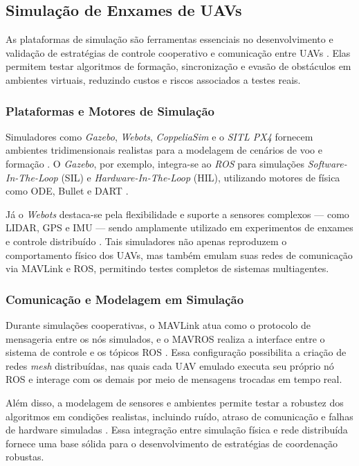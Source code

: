 \documentclass[portuguese]{sbcreviews-2025}%
\begin{document}
\subsection{Simulação de Enxames de UAVs}

As plataformas de simulação são ferramentas essenciais no desenvolvimento e validação de estratégias de controle cooperativo e comunicação entre UAVs \cite{khaliq2021, ziming2023}. Elas permitem testar algoritmos de formação, sincronização e evasão de obstáculos em ambientes virtuais, reduzindo custos e riscos associados a testes reais.

\subsubsection{Plataformas e Motores de Simulação}

Simuladores como \textit{Gazebo}, \textit{Webots}, \textit{CoppeliaSim} e o \textit{SITL PX4} fornecem ambientes tridimensionais realistas para a modelagem de cenários de voo e formação \cite{ziming2023}. O \textit{Gazebo}, por exemplo, integra-se ao \textit{ROS} para simulações \textit{Software-In-The-Loop} (SIL) e \textit{Hardware-In-The-Loop} (HIL), utilizando motores de física como ODE, Bullet e DART \cite{khaliq2021}.

Já o \textit{Webots} destaca-se pela flexibilidade e suporte a sensores complexos — como LIDAR, GPS e IMU — sendo amplamente utilizado em experimentos de enxames e controle distribuído \cite{ziming2023}. Tais simuladores não apenas reproduzem o comportamento físico dos UAVs, mas também emulam suas redes de comunicação via MAVLink e ROS, permitindo testes completos de sistemas multiagentes.

\subsubsection{Comunicação e Modelagem em Simulação}

Durante simulações cooperativas, o MAVLink atua como o protocolo de mensageria entre os nós simulados, e o MAVROS realiza a interface entre o sistema de controle e os tópicos ROS \cite{khaliq2021}. Essa configuração possibilita a criação de redes \textit{mesh} distribuídas, nas quais cada UAV emulado executa seu próprio nó ROS e interage com os demais por meio de mensagens trocadas em tempo real.

Além disso, a modelagem de sensores e ambientes permite testar a robustez dos algoritmos em condições realistas, incluindo ruído, atraso de comunicação e falhas de hardware simuladas \cite{ziming2023}. Essa integração entre simulação física e rede distribuída fornece uma base sólida para o desenvolvimento de estratégias de coordenação robustas.
\end{document}
